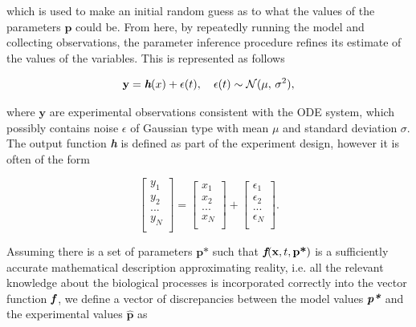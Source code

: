 \documentclass[bsc,frontabs,singlespacing,parskip,deptreport]{infthesis}
\begin{document}
which is used to make an initial random guess as to what the values of the parameters $\textbf{p}$ could be. From here, by repeatedly running the model and collecting observations, the parameter inference procedure refines its estimate of the values of the variables. This is represented as follows

\begin{equation}
    \textbf{y} = \textit{\textbf{h}}(x) + \epsilon(t), \quad \epsilon(t) \sim \mathcal{N}(\mu,\,\sigma^{2}),
\end{equation}

where $\textbf{y}$ are experimental observations consistent with the ODE system, which possibly contains noise $\epsilon$ of Gaussian type with mean $\mu$ and standard deviation $\sigma$. The output function \textit{\textbf{h}} is defined as part of the experiment design, however it is often of the form

\begin{equation}
    \begin{bmatrix}
        y_{1} \\
        y_{2} \\
        ... \\
        y_{N} \\
    \end{bmatrix}
        =
    \begin{bmatrix}
        x_{1} \\
        x_{2} \\
        ... \\
        x_{N} \\
    \end{bmatrix}
    +
    \begin{bmatrix}
        \epsilon_{1} \\
        \epsilon_{2} \\
        ... \\
        \epsilon_{N} \\
    \end{bmatrix}.
\end{equation}

Assuming there is a set of parameters $\textbf{p*}$ such that $\textit{\textbf{f}}(\textbf{x}, t, \textbf{p*})$ is a sufficiently accurate mathematical description approximating reality, i.e. all the relevant knowledge about the biological processes is incorporated correctly into the vector function $\textbf{\textit{f}}$, we define a vector of discrepancies between the model values $\textit{\textbf{p*}}$ and the experimental values $\bm{\hat{p}}$ as
\end{document}
